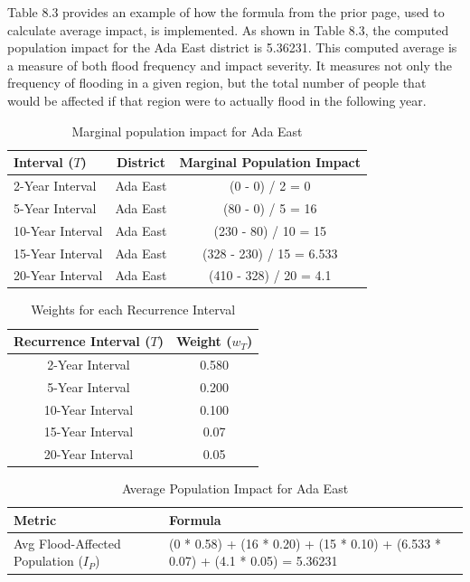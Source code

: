 Table 8.3 provides an example of how the formula from the prior page, used to calculate average impact, is implemented. As shown in Table 8.3, the computed population impact for the Ada East district is 5.36231. This computed average is a measure of both flood frequency and impact severity. It measures not only the frequency of flooding in a given region, but the total number of people that would be affected if that region were to actually flood in the following year. \\

\begin{table}
\centering
\begin{tabular}{|p{3cm}|c|c|}
\hline
\textbf{Interval (\({T}\))} & \textbf{District} & \textbf{Marginal Population Impact}\\
\hline
2-Year Interval\rule{0pt}{4ex} & Ada East & (0 - 0) / 2 = 0 \\
5-Year Interval\rule{0pt}{4ex} & Ada East & (80 - 0) / 5 = 16 \\
10-Year Interval\rule{0pt}{4ex} & Ada East & (230 - 80) / 10 = 15\\
15-Year Interval\rule{0pt}{4ex} & Ada East & (328 - 230) / 15 = 6.533\\
20-Year Interval\rule{0pt}{4ex} & Ada East & (410 - 328) / 20 = 4.1\\
\hline
\end{tabular}
\caption{Marginal population impact for Ada East}
\end{table}

\begin{table}
\centering
\begin{tabular}{|c|c|}
\hline
\textbf{Recurrence Interval (\({T}\))} & \textbf{Weight (\({w_T}\))}\\
\hline
2-Year Interval\rule{0pt}{4ex} & 0.580 \\
5-Year Interval\rule{0pt}{4ex} & 0.200 \\
10-Year Interval\rule{0pt}{4ex} & 0.100 \\
15-Year Interval\rule{0pt}{4ex} & 0.07 \\
20-Year Interval\rule{0pt}{4ex} & 0.05 \\
\hline
\end{tabular}
\caption{Weights for each Recurrence Interval}
\end{table}

\begin{table}
\centering
\begin{tabular}{|p{4cm}|p{7cm}|}
\hline
\textbf{Metric} & \textbf{Formula}\\
\hline
Avg Flood-Affected Population (\({I_P}\)) & (0 * 0.58) + (16 * 0.20) + (15 * 0.10) + (6.533 * 0.07) + (4.1 * 0.05) = 5.36231\\
\hline
\end{tabular}
\caption{Average Population Impact for Ada East}
\end{table}

